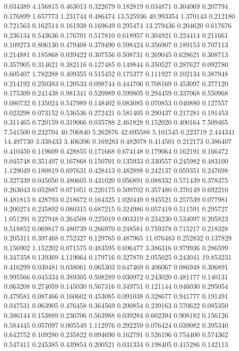 0.034389
4.156815
0.463013
0.322679
0.182819
0.034871
0.304069
0.207794
0.176899
1.657773
1.231744
0.486474
13.525936
40.993354
1.370143
0.212180
0.721563
0.162514
0.161938
0.169649
0.295474
13.279436
0.204620
0.617676
0.236134
0.543636
0.176701
0.517810
0.618957
0.304921
0.224414
0.211661
0.109273
0.806130
0.479408
0.379490
0.598424
0.356907
0.189153
0.707113
0.214881
0.185868
0.039422
0.307556
0.508731
0.269045
0.628621
0.308713
0.357905
0.314621
0.382116
0.127485
0.149844
0.350527
0.287627
0.092780
0.605407
1.782288
0.409355
0.515452
0.175377
0.111927
0.102134
0.387948
0.214192
0.250383
0.120533
0.098744
0.444706
0.708169
0.453097
0.377120
0.175309
0.241438
0.981341
0.520989
0.599805
0.294459
0.337068
0.550968
0.080732
0.135024
0.547989
0.148402
0.083085
0.070853
0.040880
0.127557
0.023298
0.073152
0.536536
0.272421
0.581405
0.290437
0.217281
0.191453
0.311465
0.720159
0.319066
0.035788
2.461828
0.152020
0.400164
7.509465
7.541500
0.232704
40.706840
5.262876
42.695588
5.101545
0.223719
2.444341
14.497730
3.338433
3.406396
0.169283
0.482078
0.414501
0.212173
0.386407
0.410450
0.119609
0.428855
0.171668
0.674148
0.179064
0.162191
0.166472
0.045748
0.351497
0.167868
0.150701
0.135933
0.330557
0.245982
0.483100
1.129049
0.180819
0.697631
0.428413
0.482898
0.242137
0.059351
0.247698
0.327339
0.045050
0.480605
0.431020
0.056891
0.088332
0.571439
0.378375
0.263043
0.052887
0.071051
0.220175
0.509702
0.357480
0.370149
0.692210
0.481813
0.428793
0.218672
0.164325
1.020449
0.945521
0.257539
0.077981
0.200274
0.235892
0.080315
0.687215
0.324986
0.057419
0.511591
0.295727
1.051291
0.227948
0.264508
0.225019
0.003319
0.234230
0.534097
0.205823
0.518852
0.069817
0.480739
0.266970
0.248581
0.759378
0.715217
0.218328
0.205311
0.397468
0.752327
0.129765
0.487965
11.076483
0.252832
0.137829
0.156902
1.152202
0.071575
0.483595
0.696477
3.386316
0.979936
0.286599
0.347358
0.139369
4.119064
0.179716
0.327870
2.055025
0.243041
19.853231
0.416299
0.030481
0.038061
0.065303
0.647469
0.406067
0.086948
0.306891
0.995566
0.045334
0.389305
0.508289
0.030972
0.243020
0.481177
0.140131
0.063208
0.274059
0.145030
0.567316
0.349751
0.121144
0.046030
0.295054
0.479581
0.087466
0.160602
0.453085
0.091038
0.328677
0.941777
0.191491
0.047531
0.063905
0.476458
0.364569
0.200854
0.239163
0.570622
0.085350
0.386144
0.153889
0.236706
0.563988
0.039284
0.602394
0.908182
0.156126
0.584445
0.057097
0.005549
1.112976
0.292259
0.076424
0.039082
0.395340
0.642752
0.109280
0.235822
0.094690
0.162791
0.526196
0.754400
0.574362
0.547411
0.245385
0.439854
0.200521
0.031334
0.198405
0.415286
0.142113
